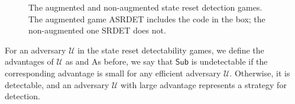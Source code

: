 \begin{figure}
\centering
\begin{pchstack}
\begin{pcvstack}
\pcvspace
{}
\end{pcvstack}
\pchspace
{}
\end{pchstack}
\caption[The augmented and non-augmented state reset detection games]{The augmented and non-augmented state reset detection games. The augmented game ASRDET includes the code in the box; the non-augmented one SRDET does not.}
\label{game:gendetect}
\end{figure}

For an adversary $\mathcal{U}$ in the state reset detectability games, we define the advantages of $\mathcal{U}$ as
and
As before, we say that $\mathsf{Sub}$ is undetectable if the corresponding advantage is small for any efficient adversary $\mathcal{U}$. Otherwise, it is detectable, and an adversary $\mathcal{U}$ with large advantage represents a strategy for detection.

